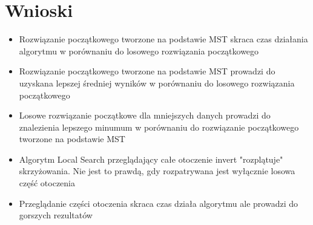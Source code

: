 \documentclass{article}
\begin{document}
\section{Wnioski}
\begin{itemize}
    \item Rozwiązanie początkowego tworzone na podstawie MST skraca czas działania algorytmu w porównaniu do losowego rozwiązania początkowego
    \item Rozwiązanie początkowego tworzone na podstawie MST prowadzi do uzyskana lepszej średniej wyników w porównaniu do losowego rozwiązania początkowego
    \item Losowe rozwiązanie początkowe dla mniejszych danych prowadzi do znalezienia lepszego minumum w porównaniu do rozwiązanie początkowego tworzone na podstawie MST
    \item Algorytm Local Search przeglądający całe otoczenie invert "rozplątuje" skrzyżowania. Nie jest to prawdą, gdy rozpatrywana jest wyłącznie losowa część otoczenia
    \item Przeglądanie części otoczenia skraca czas działa algorytmu ale prowadzi do gorszych rezultatów
\end{itemize}




    

\end{document}

